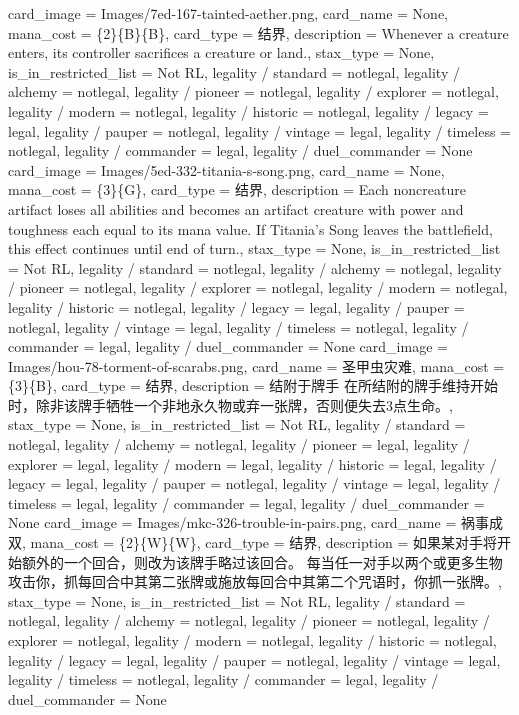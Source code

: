 \documentclass[lang = cn, color = black, 10pt]{AllThatStax}
\begin{document}
\card
{
	card_image = Images/7ed-167-tainted-aether.png,
	card_name = None,
	mana_cost = \{2\}\{B\}\{B\},
	card_type = 结界,
	description = Whenever a creature enters, its controller sacrifices a creature or land.,
	stax_type = None,
	is_in_restricted_list = Not RL,
	legality / standard = notlegal,
	legality / alchemy = notlegal,
	legality / pioneer = notlegal,
	legality / explorer = notlegal,
	legality / modern = notlegal,
	legality / historic = notlegal,
	legality / legacy = legal,
	legality / pauper = notlegal,
	legality / vintage = legal,
	legality / timeless = notlegal,
	legality / commander = legal,
	legality / duel_commander = None
}
\card
{
	card_image = Images/5ed-332-titania-s-song.png,
	card_name = None,
	mana_cost = \{3\}\{G\},
	card_type = 结界,
	description = Each noncreature artifact loses all abilities and becomes an artifact creature with power and toughness each equal to its mana value. If Titania's Song leaves the battlefield, this effect continues until end of turn.,
	stax_type = None,
	is_in_restricted_list = Not RL,
	legality / standard = notlegal,
	legality / alchemy = notlegal,
	legality / pioneer = notlegal,
	legality / explorer = notlegal,
	legality / modern = notlegal,
	legality / historic = notlegal,
	legality / legacy = legal,
	legality / pauper = notlegal,
	legality / vintage = legal,
	legality / timeless = notlegal,
	legality / commander = legal,
	legality / duel_commander = None
}
\card
{
	card_image = Images/hou-78-torment-of-scarabs.png,
	card_name = 圣甲虫灾难,
	mana_cost = \{3\}\{B\},
	card_type = 结界,
	description = 结附于牌手
	在所结附的牌手维持开始时，除非该牌手牺牲一个非地永久物或弃一张牌，否则便失去3点生命。,
	stax_type = None,
	is_in_restricted_list = Not RL,
	legality / standard = notlegal,
	legality / alchemy = notlegal,
	legality / pioneer = legal,
	legality / explorer = legal,
	legality / modern = legal,
	legality / historic = legal,
	legality / legacy = legal,
	legality / pauper = notlegal,
	legality / vintage = legal,
	legality / timeless = legal,
	legality / commander = legal,
	legality / duel_commander = None
}
\card
{
	card_image = Images/mkc-326-trouble-in-pairs.png,
	card_name = 祸事成双,
	mana_cost = \{2\}\{W\}\{W\},
	card_type = 结界,
	description = 如果某对手将开始额外的一个回合，则改为该牌手略过该回合。
	每当任一对手以两个或更多生物攻击你，抓每回合中其第二张牌或施放每回合中其第二个咒语时，你抓一张牌。,
	stax_type = None,
	is_in_restricted_list = Not RL,
	legality / standard = notlegal,
	legality / alchemy = notlegal,
	legality / pioneer = notlegal,
	legality / explorer = notlegal,
	legality / modern = notlegal,
	legality / historic = notlegal,
	legality / legacy = legal,
	legality / pauper = notlegal,
	legality / vintage = legal,
	legality / timeless = notlegal,
	legality / commander = legal,
	legality / duel_commander = None
}
\end{document}
